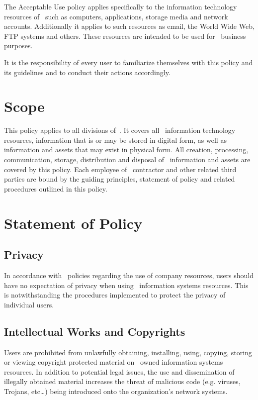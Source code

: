 \documentclass[use]{policy}
\begin{document}
		The Acceptable Use policy applies specifically to the information technology resources of \theOrganization\  such as computers, applications, storage media and network accounts.  Additionally it applies to such resources as email, the World Wide Web, FTP systems and others.  These resources are intended to be used for \theOrganization\  business purposes.  
		
		It is the responsibility of every user to familiarize themselves with this policy and its guidelines and to conduct their actions accordingly.
		
	
	\section{Scope}
	
		This policy applies to all divisions of \theOrganization\,.  It covers all \theOrganization\ information technology resources, information that is or may be stored in digital form, as well as information and assets that may exist in physical form.  All creation, processing, communication, storage, distribution and disposal of \theOrganization\ information and assets are covered by this policy.  Each employee of \theOrganization\, contractor and other related third parties are bound by the guiding principles, statement of policy and related procedures outlined in this policy. 
	
	
	\section{Statement of Policy}
	
		\subsection{Privacy}
			In accordance with \theOrganization\ policies regarding the use of company resources, users should have no expectation of privacy when using \theOrganization\  information systems resources.  This is notwithstanding the procedures implemented to protect the privacy of individual users.
		
		\subsection{Intellectual Works and Copyrights}
			Users are prohibited from unlawfully obtaining, installing, using, copying, storing or viewing copyright protected material on \theOrganization\  owned information systems resources.  In addition to potential legal issues, the use and dissemination of illegally obtained material increases the threat of malicious code (e.g. viruses, Trojans, etc…) being introduced onto the organization’s network systems. 
		 
\end{document}
